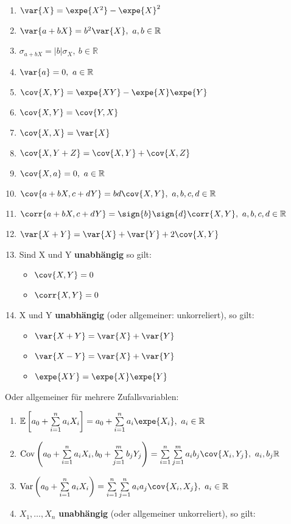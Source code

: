\documentclass[8pt,a4paper]{scrartcl}
\begin{document}
\begin{multicols*}{3}
\begin{enumerate}
\item $\var{X}=\expe{X^2}-\expe{X}^2$
\item $\var{a+bX}=b^2\var{X},\ a,b\in\mathbb{R}$
\item $\sigma_{a+bX}=|b|\sigma_X,\ b\in\mathbb{R}$
\item $\var{a}=0,\ a\in\mathbb{R}$
\item $\cov{X,Y}=\expe{XY}-\expe{X}\expe{Y}$
\item $\cov{X,Y}=\cov{Y,X}$
\item $\cov{X,X}=\var{X}$
\item $\cov{X,Y+Z}=\cov{X,Y}+\cov{X,Z}$
\item $\cov{X,a}=0,\ a\in\mathbb{R}$
\item $\cov{a+bX,c+dY}=bd\cov{X,Y},\ a,b,c,d\in\mathbb{R}$
\item $\corr{a+bX,c+dY}=\sign{b}\sign{d}\corr{X,Y},\ a,b,c,d\in\mathbb{R}$
\item $\var{X+Y}=\var{X}+\var{Y}+2\cov{X,Y}$
\item Sind X und Y \textbf{unabhängig} so gilt:
\begin{itemize}
\ncompaq
\item $\cov{X,Y}=0$
\item $\corr{X,Y}=0$
\end{itemize}
\item X und Y \textbf{unabhängig} (oder allgemeiner: unkorreliert), so gilt:
\begin{itemize}
\ncompaq
\item $\var{X+Y}=\var{X}+\var{Y}$
\item $\var{X-Y}=\var{X}+\var{Y}$
\item $\expe{XY}=\expe{X}\expe{Y}$
\end{itemize}
\end{enumerate}

Oder allgemeiner für mehrere Zufallsvariablen:

\begin{enumerate}
\ncompaq
\setcounter{enumi}{16}
\item $\mathbb{E}\left[a_0+\sum\limits_{i=1}^na_iX_i\right]=a_0+\sum\limits_{i=1}^na_i\expe{X_i},\ a_i\in\mathbb{R}$
\item \small$\text{Cov}\left(a_0+\sum\limits_{i=1}^na_iX_i,b_0+\sum\limits_{j=1}^mb_jY_j\right)=\sum\limits_{i=1}^n\sum\limits_{j=1}^ma_ib_j\cov{X_i,Y_j},\ a_i,b_j\mathbb{R}$\normalsize
\item $\text{Var}\left(a_0+\sum\limits_{i=1}^na_iX_i\right)=\sum\limits_{i=1}^n\sum\limits_{j=1}^na_ia_j\cov{X_i,X_j},\ a_i\in\mathbb{R}$
\item $X_1,\ldots,X_n$ \textbf{unabhängig} (oder allgemeiner unkorreliert), so gilt:


\end{enumerate}
\end{multicols*}
\end{document}
